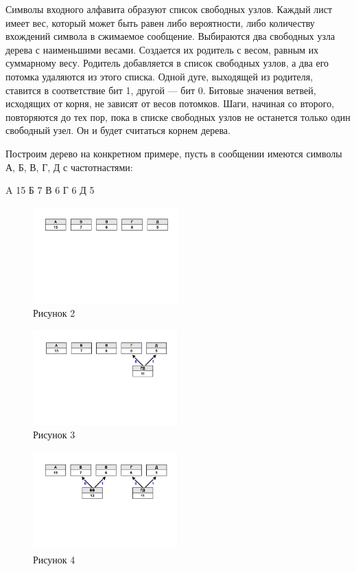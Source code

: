 \documentclass[12pt]{article}
\begin{document}
Символы входного алфавита образуют список свободных узлов. Каждый лист имеет вес, который может быть равен либо вероятности, либо количеству вхождений символа в сжимаемое сообщение.
Выбираются два свободных узла дерева с наименьшими весами.
Создается их родитель с весом, равным их суммарному весу.
Родитель добавляется в список свободных узлов, а два его потомка удаляются из этого списка.
Одной дуге, выходящей из родителя, ставится в соответствие бит 1, другой — бит 0. Битовые значения ветвей, исходящих от корня, не зависят от весов потомков.
Шаги, начиная со второго, повторяются до тех пор, пока в списке свободных узлов не останется только один свободный узел. Он и будет считаться корнем дерева.

Построим дерево на конкретном примере, пусть в сообщении имеются символы А, Б, В, Г, Д с частотнастями:

A 15
Б 7
В 6
Г 6
Д 5

\begin{figure}[h!]
\centering
\includegraphics[width=0.5\textwidth]{../images/haffman/phase0.png}
\caption{Рисунок 2}
\end{figure}

\begin{figure}[h!]
\centering
\includegraphics[width=0.5\textwidth]{../images/haffman/phase1.png}
\caption{Рисунок 3}
\end{figure}

\begin{figure}[h!]
\centering
\includegraphics[width=0.5\textwidth]{../images/haffman/phase2.png}
\caption{Рисунок 4}
\end{figure}
\end{document}
